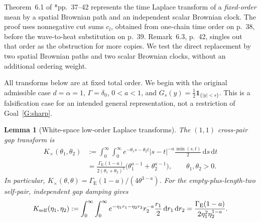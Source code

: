 \documentclass[12pt]{article}
\numberwithin{equation}{section}
\newtheorem{lemma}[theorem]{Lemma}
\theoremstyle{definition}
\newcommand{\ud}{\,\mathrm{d}}
\begin{document}
Theorem~6.1 of \cite{chen:author2026:time-dependency}*{pp.~37--42}
represents the time Laplace transform of a \emph{fixed-order} mean by a
spatial Brownian path and an independent scalar Brownian clock.
The proof uses nonnegative cut sums \(c_l\), obtained from one-chain time
order on p.~38, before the wave-to-heat substitution on p.~39.
Remark~6.3, p.~42, singles out that order as the obstruction for more copies.
We test the direct replacement by two spatial Brownian paths and two scalar
Brownian clocks, without an additional ordering weight.

All transforms below are at fixed total order. We begin with the original
admissible case \(d=\alpha=1\), \(\Gamma=\delta_0\), \(0<a<1\), and
\(G_s(y)=\frac12\mathbf1_{\{|y|<s\}}\).
This is a falsification case for an intended general representation,
not a restriction of Goal~\ref{G:sharp}.

\begin{lemma}[White-space low-order Laplace transforms]
  \label{L:white-clock-laplace}
  The \((1,1)\) cross-pair gap transform is
  \begin{equation}\label{E:white-cross-clock-transform}
    \begin{split}
      K_\times(\theta_1,\theta_2)
      &:=\int_0^\infty\int_0^\infty
      e^{-\theta_1s-\theta_2t}|s-t|^{-a}
      \frac{\min(s,t)}2\ud s\ud t\\
      &=\frac{\Gamma_{\mathrm E}(1-a)}
      {2(\theta_1+\theta_2)^2}
      \big(\theta_1^{a-1}+\theta_2^{a-1}\big),
      \qquad \theta_1,\theta_2>0.
    \end{split}
  \end{equation}
  In particular,
  \(K_\times(\theta,\theta)=
  \Gamma_{\mathrm E}(1-a)/(4\theta^{3-a})\).
  For the empty-plus-length-two self-pair, independent gap damping gives
  \begin{equation}\label{E:white-self-clock-transform}
    K_{\rm self}(\eta_1,\eta_2)
    :=\int_0^\infty\int_0^\infty
    e^{-\eta_1r_1-\eta_2r_2}r_2^{-a}\frac{r_1}2
    \ud r_1\ud r_2
    =\frac{\Gamma_{\mathrm E}(1-a)}
    {2\eta_1^2\eta_2^{1-a}}.
  \end{equation}
\end{lemma}
\end{document}
